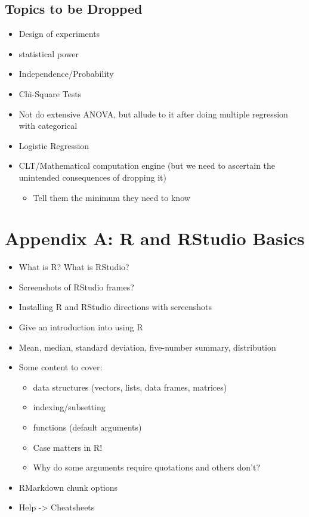 \documentclass[]{tufte-book}
\providecommand{\tightlist}{%
  \setlength{\itemsep}{0pt}\setlength{\parskip}{0pt}}
\begin{document}
\section{Topics to be Dropped}\label{topics-to-be-dropped}

\begin{itemize}
\tightlist
\item
  Design of experiments
\item
  statistical power
\item
  Independence/Probability
\item
  Chi-Square Tests
\item
  Not do extensive ANOVA, but allude to it after doing multiple
  regression with categorical
\item
  Logistic Regression
\item
  CLT/Mathematical computation engine (but we need to ascertain the
  unintended consequences of dropping it)

  \begin{itemize}
  \tightlist
  \item
    Tell them the minimum they need to know
  \end{itemize}
\end{itemize}

\chapter{Appendix A: R and RStudio Basics}\label{appendix1}

\begin{itemize}
\tightlist
\item
  What is R? What is RStudio?
\item
  Screenshots of RStudio frames?
\item
  Installing R and RStudio directions with screenshots
\item
  Give an introduction into using R
\item
  Mean, median, standard deviation, five-number summary, distribution
\item
  Some content to cover:

  \begin{itemize}
  \tightlist
  \item
    data structures (vectors, lists, data frames, matrices)
  \item
    indexing/subsetting
  \item
    functions (default arguments)
  \item
    Case matters in R!
  \item
    Why do some arguments require quotations and others don't?
  \end{itemize}
\item
  RMarkdown chunk options
\item
  Help -\textgreater{} Cheatsheets
\end{itemize}
\end{document}
